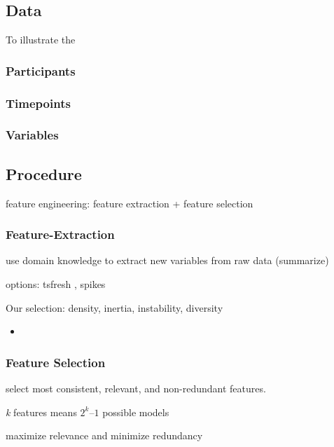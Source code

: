 \subsection{Data}

To illustrate the

\subsubsection{Participants}

\subsubsection{Timepoints}

\subsubsection{Variables}

\subsection{Procedure}

feature engineering: feature extraction + feature selection

\subsubsection{Feature-Extraction}

use domain knowledge to extract new variables from raw data (summarize)

options: tsfresh \citep[][]{christ2018}, spikes
\citep[][]{caro-martin2018}

Our selection: density, inertia, instability, diversity
\citep[][]{dejonckheere2019, kuppens2017}

\begin{itemize}
  \item 
\end{itemize}

\subsubsection{Feature Selection}

select most consistent, relevant, and non-redundant features.

\textit{k} features means \(2^k – 1\) possible models

maximize relevance and minimize redundancy

